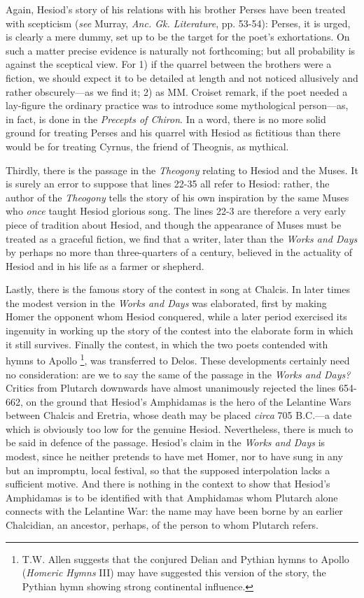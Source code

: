 Again, Hesiod’s story of his relations with his brother Perses have been
treated with scepticism (\emph{see} Murray, \emph{Anc. Gk. Literature}, pp.
53-54): Perses, it is urged, is clearly a mere dummy, set up to be the target
for the poet’s exhortations. On such a matter precise evidence is
naturally not forthcoming; but all probability is against the sceptical view.
For 1) if the quarrel between the brothers were a fiction, we should expect it
to be detailed at length and not noticed allusively and rather
obscurely—as we find it; 2) as MM. Croiset remark, if the poet needed a
lay-figure the ordinary practice was to introduce some mythological
person—as, in fact, is done in the \emph{Precepts of Chiron}. In a word,
there is no more solid ground for treating Perses and his quarrel with Hesiod
as fictitious than there would be for treating Cyrnus, the friend of Theognis,
as mythical.

Thirdly, there is the passage in the \emph{Theogony} relating to Hesiod and the
Muses. It is surely an error to suppose that lines 22-35 all refer to Hesiod:
rather, the author of the \emph{Theogony} tells the story of his own
inspiration by the same Muses who \emph{once} taught Hesiod glorious song. The
lines 22-3 are therefore a very early piece of tradition about Hesiod, and
though the appearance of Muses must be treated as a graceful fiction, we find
that a writer, later than the \emph{Works and Days} by perhaps no more than
three-quarters of a century, believed in the actuality of Hesiod and in his
life as a farmer or shepherd.

Lastly, there is the famous story of the contest in song at Chalcis. In later
times the modest version in the \emph{Works and Days} was elaborated, first by
making Homer the opponent whom Hesiod conquered, while a later period exercised
its ingenuity in working up the story of the contest into the elaborate form in
which it still survives. Finally the contest, in which the two poets contended
with hymns to Apollo \footnote{T.W. Allen suggests that
the conjured Delian and Pythian hymns to Apollo (\emph{Homeric Hymns} III) may
have suggested this version of the story, the Pythian hymn showing strong
continental influence.}, was transferred to Delos. These
developments certainly need no consideration: are we to say the same of the
passage in the \emph{Works and Days?} Critics from Plutarch downwards have
almost unanimously rejected the lines 654-662, on the ground that
Hesiod’s Amphidamas is the hero of the Lelantine Wars between Chalcis and
Eretria, whose death may be placed \emph{circa} 705 B.C.—a date which is
obviously too low for the genuine Hesiod. Nevertheless, there is much to be
said in defence of the passage. Hesiod’s claim in the \emph{Works and
Days} is modest, since he neither pretends to have met Homer, nor to have
sung in any but an impromptu, local festival, so that the supposed
interpolation lacks a sufficient motive. And there is nothing in the context to
show that Hesiod’s Amphidamas is to be identified with that Amphidamas
whom Plutarch alone connects with the Lelantine War: the name may have been
borne by an earlier Chalcidian, an ancestor, perhaps, of the person to whom
Plutarch refers.

